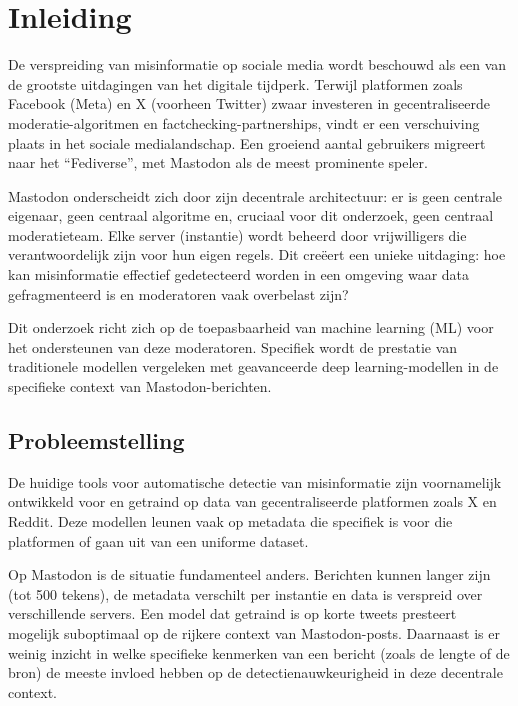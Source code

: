\documentclass[a4paper,11pt]{report}
\begin{document}
\chapter{Inleiding}
\label{ch:inleiding}

De verspreiding van misinformatie op sociale media wordt beschouwd als een van de grootste uitdagingen van het digitale tijdperk. Terwijl platformen zoals Facebook (Meta) en X (voorheen Twitter) zwaar investeren in gecentraliseerde moderatie-algoritmen en factchecking-partnerships, vindt er een verschuiving plaats in het sociale medialandschap. Een groeiend aantal gebruikers migreert naar het ``Fediverse'', met Mastodon als de meest prominente speler.

Mastodon onderscheidt zich door zijn decentrale architectuur: er is geen centrale eigenaar, geen centraal algoritme en, cruciaal voor dit onderzoek, geen centraal moderatieteam. Elke server (instantie) wordt beheerd door vrijwilligers die verantwoordelijk zijn voor hun eigen regels. Dit creëert een unieke uitdaging: hoe kan misinformatie effectief gedetecteerd worden in een omgeving waar data gefragmenteerd is en moderatoren vaak overbelast zijn?

Dit onderzoek richt zich op de toepasbaarheid van machine learning (ML) voor het ondersteunen van deze moderatoren. Specifiek wordt de prestatie van traditionele modellen vergeleken met geavanceerde deep learning-modellen in de specifieke context van Mastodon-berichten.

\section{Probleemstelling}
\label{sec:probleemstelling}

De huidige tools voor automatische detectie van misinformatie zijn voornamelijk ontwikkeld voor en getraind op data van gecentraliseerde platformen zoals X en Reddit. Deze modellen leunen vaak op metadata die specifiek is voor die platformen of gaan uit van een uniforme dataset.

Op Mastodon is de situatie fundamenteel anders. Berichten kunnen langer zijn (tot 500 tekens), de metadata verschilt per instantie en data is verspreid over verschillende servers. Een model dat getraind is op korte tweets presteert mogelijk suboptimaal op de rijkere context van Mastodon-posts. Daarnaast is er weinig inzicht in welke specifieke kenmerken van een bericht (zoals de lengte of de bron) de meeste invloed hebben op de detectienauwkeurigheid in deze decentrale context.
\end{document}
